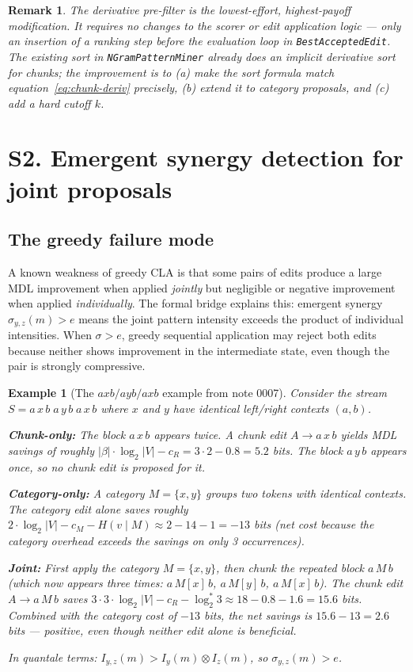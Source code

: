 \documentclass[11pt]{article}
\newtheorem{example}{Example}
\newtheorem{remark}{Remark}
\begin{document}
\begin{remark}
The derivative pre-filter is the lowest-effort, highest-payoff modification.  It requires no changes to the scorer or edit application logic --- only an insertion of a ranking step before the evaluation loop in \texttt{BestAcceptedEdit}.  The existing sort in \texttt{NGramPatternMiner} already does an implicit derivative sort for chunks; the improvement is to (a) make the sort formula match equation~\eqref{eq:chunk-deriv} precisely, (b) extend it to category proposals, and (c) add a hard cutoff $k$.
\end{remark}

\section{S2. Emergent synergy detection for joint proposals}

\subsection{The greedy failure mode}

A known weakness of greedy CLA is that some pairs of edits produce a large MDL improvement when applied \emph{jointly} but negligible or negative improvement when applied \emph{individually}.  The formal bridge explains this: emergent synergy $\sigma_{y,z}(m) > e$ means the joint pattern intensity exceeds the product of individual intensities.  When $\sigma > e$, greedy sequential application may reject both edits because neither shows improvement in the intermediate state, even though the pair is strongly compressive.

\begin{example}[The $axb/ayb/axb$ example from note 0007]
\label{ex:axb}
Consider the stream $S = a\, x\, b\; a\, y\, b\; a\, x\, b$ where $x$ and $y$ have identical left/right contexts $(a, b)$.

\textbf{Chunk-only:} The block $a\, x\, b$ appears twice.  A chunk edit $A \to a\, x\, b$ yields MDL savings of roughly $|\beta| \cdot \log_2 |V| - c_R = 3 \cdot 2 - 0.8 = 5.2$ bits.  The block $a\, y\, b$ appears once, so no chunk edit is proposed for it.

\textbf{Category-only:} A category $M = \{x, y\}$ groups two tokens with identical contexts.  The category edit alone saves roughly $2 \cdot \log_2 |V| - c_M - H(v \mid M) \approx 2 - 14 - 1 = -13$ bits (net cost because the category overhead exceeds the savings on only 3 occurrences).

\textbf{Joint:} First apply the category $M = \{x, y\}$, then chunk the repeated block $a\, M\, b$ (which now appears \emph{three} times: $a\, M[x]\, b$, $a\, M[y]\, b$, $a\, M[x]\, b$).  The chunk edit $A \to a\, M\, b$ saves $3 \cdot 3 \cdot \log_2 |V| - c_R - \log_2^* 3 \approx 18 - 0.8 - 1.6 = 15.6$ bits.  Combined with the category cost of $-13$ bits, the net savings is $15.6 - 13 = 2.6$ bits --- positive, even though neither edit alone is beneficial.

In quantale terms: $I_{y,z}(m) > I_y(m) \otimes I_z(m)$, so $\sigma_{y,z}(m) > e$.
\end{example}
\end{document}

